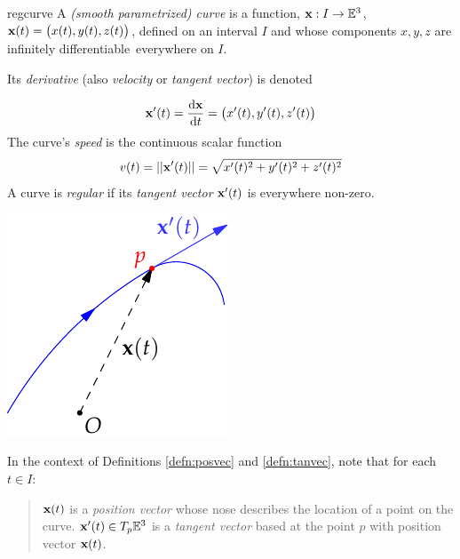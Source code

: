 

\begin{defn}{}{regcurve}
	A \emph{(smooth parametrized) curve} is a function, $\vx:I\to\E^3$, $\vx(t)=\bigl(x(t),y(t),z(t)\bigr)$, defined on an interval $I$ and whose components $x,y,z$ are infinitely differentiable\footnotemark\ everywhere on $I$.\par
	Its \emph{derivative} (also \emph{velocity} or \emph{tangent vector}) is denoted\par
	\begin{minipage}[t]{0.7\linewidth}\vspace{-10pt}
		\[
			\vx'(t)=\diff[\vx]{t}=\bigl(x'(t),y'(t),z'(t)\bigr)
		\]
		The curve's \emph{speed} is the continuous scalar function 
		\[
			v(t)=\Nm{\vx'(t)}=\sqrt{x'(t)^2+y'(t)^2+z'(t)^2}
		\]
		A curve is \emph{regular} if its \emph{tangent vector} $\vx'(t)$ is everywhere non-zero. 
	\end{minipage}
	\hfill
	\begin{minipage}[t]{0.29\linewidth}\vspace{0pt}
		\flushright\includegraphics{curves-tangent-vector}
	\end{minipage}
\end{defn}


In the context of Definitions \ref{defn:posvec} and \ref{defn:tanvec}, note that for each $t\in I$:
\begin{quote}
	$\vx(t)$ is a \emph{position vector} whose nose describes the location of a point on the curve.\smallbreak
	$\vx'(t)\in T_p\E^3$ is a \emph{tangent vector} based at the point $p$ with position vector $\vx(t)$.
\end{quote}

